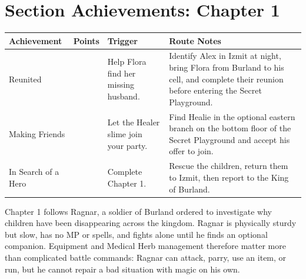 \documentclass[
  american,
  10pt,
  letterpaper,
  oneside,
  open=any]{scrreprt}
\newcounter{none} %
\newenvironment{guidetable}{%
  \small\setstretch{1.0}%
  \setlength{\tabcolsep}{4pt}%
  \setlength{\LTpre}{8pt}\setlength{\LTpost}{10pt}%
  \renewcommand{\arraystretch}{1.16}%
}{ }
\begin{document}
\section{Section Achievements: Chapter
1}\label{section-achievements-chapter-1}

\begin{guidetable}

{\def\LTcaptype{none} %
\begin{longtable}[]{@{}
  >{\raggedright\arraybackslash}p{}
  >{\raggedleft\arraybackslash}p{}
  >{\raggedright\arraybackslash}p{}
  >{\raggedright\arraybackslash}p{}@{}}
\toprule\noalign{}
\begin{minipage}[b]{\linewidth}\raggedright
\color{GuideGreen}\bfseries Achievement
\end{minipage} & \begin{minipage}[b]{\linewidth}\raggedleft
\color{GuideGreen}\bfseries Points
\end{minipage} & \begin{minipage}[b]{\linewidth}\raggedright
\color{GuideGreen}\bfseries Trigger
\end{minipage} & \begin{minipage}[b]{\linewidth}\raggedright
\color{GuideGreen}\bfseries Route Notes
\end{minipage} \\
\midrule\noalign{}
\endhead
\bottomrule\noalign{}
\endlastfoot
Reunited & 5 & Help Flora find her missing husband. & Identify Alex in
Izmit at night, bring Flora from Burland to his cell, and complete their
reunion before entering the Secret Playground. \\
Making Friends & 5 & Let the Healer slime join your party. & Find Healie
in the optional eastern branch on the bottom floor of the Secret
Playground and accept his offer to join. \\
In Search of a Hero & 10 & Complete Chapter 1. & Rescue the children,
return them to Izmit, then report to the King of Burland. \\
\end{longtable}
}

\end{guidetable}

Chapter 1 follows Ragnar, a soldier of Burland ordered to investigate
why children have been disappearing across the kingdom. Ragnar is
physically sturdy but slow, has no MP or spells, and fights alone until
he finds an optional companion. Equipment and Medical Herb management
therefore matter more than complicated battle commands: Ragnar can
attack, parry, use an item, or run, but he cannot repair a bad situation
with magic on his own.
\end{document}

